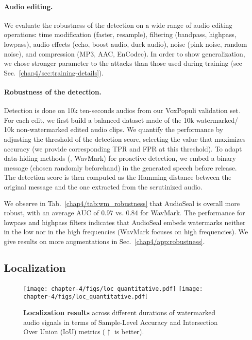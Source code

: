 \paragraph*{Audio editing.}
We evaluate the robustness of the detection on a wide range of audio editing operations: 
time modification (faster, resample), 
filtering (bandpass, highpass, lowpass), 
audio effects (echo, boost audio, duck audio), 
noise (pink noise, random noise),
and compression (MP3, AAC, EnCodec).
In order to show generalization, we chose stronger parameter to the attacks than those used during training (see Sec.~\ref{chap4/sec:training-details}).

\paragraph*{Robustness of the detection.}
Detection is done on 10k ten-seconds audios from our VoxPopuli validation set.
For each edit, we first build a balanced dataset made of the 10k watermarked/ 10k non-watermarked edited audio clips.
We quantify the performance by adjusting the threshold of the detection score, selecting the value that maximizes accuracy (we provide corresponding TPR and FPR at this threshold).
To adapt data-hiding methods (\eg, WavMark) for proactive detection, we embed a binary message (chosen randomly beforehand) in the generated speech before release. The detection score is then computed as the Hamming distance between the original message and the one extracted from the scrutinized audio. 

We observe in Tab.~\ref{chap4/tab:wm_robustness} that AudioSeal is overall more robust, with an average AUC of 0.97 vs. 0.84 for WavMark.
The performance for lowpass and highpass filters indicates that AudioSeal embeds watermarks neither in the low nor in the high frequencies (WavMark focuses on high frequencies).
We give results on more augmentations in Sec.~\ref{chap4/app:robustness}.



\subsection{Localization}


\begin{figure}[b!]
    \centering
    \texttt{[image: chapter-4/figs/loc\_quantitative.pdf]}\hfill
    \texttt{[image: chapter-4/figs/loc\_quantitative.pdf]}
    \caption{\textbf{Localization results} across different durations of watermarked audio signals in terms of Sample-Level Accuracy and Intersection Over Union (IoU) metrics ($\uparrow$ is better).}
    \label{chap4/fig:loc_quantitative}
\end{figure}


